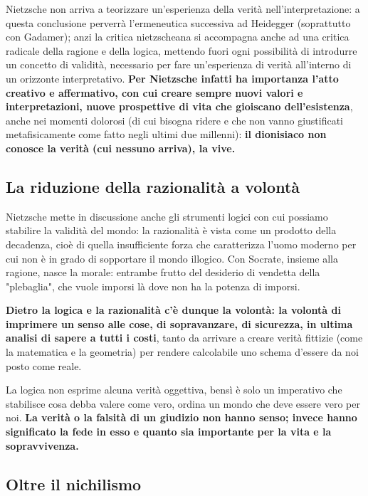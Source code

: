 Nietzsche non arriva a teorizzare un'esperienza della verità nell'interpretazione: a questa conclusione perverrà l'ermeneutica successiva ad Heidegger (soprattutto con Gadamer); anzi la critica nietzscheana si accompagna anche ad una critica radicale della ragione e della logica, mettendo fuori ogni possibilità di introdurre un concetto di validità, necessario per fare un'esperienza di verità all'interno di un orizzonte interpretativo. \textbf{Per Nietzsche infatti ha importanza l'atto creativo e affermativo, con cui creare sempre nuovi valori e interpretazioni, nuove prospettive di vita che gioiscano  dell'esistenza}, anche nei momenti dolorosi (di cui bisogna ridere e che non vanno giustificati metafisicamente come fatto negli ultimi due millenni): \textbf{il dionisiaco non conosce la verità (cui nessuno arriva), la vive.}

\subsection{La riduzione della razionalità a volontà}

Nietzsche mette in discussione anche gli strumenti logici con cui possiamo stabilire la validità del mondo: la razionalità è vista come un prodotto della decadenza, cioè di quella insufficiente forza che caratterizza l'uomo moderno per cui non è in grado di sopportare il mondo illogico.
Con Socrate, insieme alla ragione, nasce la morale: entrambe frutto del desiderio di vendetta della "plebaglia", che vuole imporsi là dove non ha la potenza di imporsi.

\textbf{Dietro la logica e la razionalità c'è dunque la volontà: la volontà di imprimere un senso alle cose, di sopravanzare, di sicurezza, in ultima analisi di sapere a tutti i costi}, tanto da arrivare a creare verità fittizie (come la matematica e la geometria) per rendere calcolabile uno schema d'essere da noi posto come reale.

La logica non esprime alcuna verità oggettiva, bensì è solo un imperativo che stabilisce cosa debba valere come vero, ordina un mondo che deve essere vero per noi. \textbf{La verità o la falsità di un giudizio non hanno senso; invece hanno significato la fede in esso e quanto sia importante per la vita e la sopravvivenza.}

\subsection{Oltre il nichilismo}

